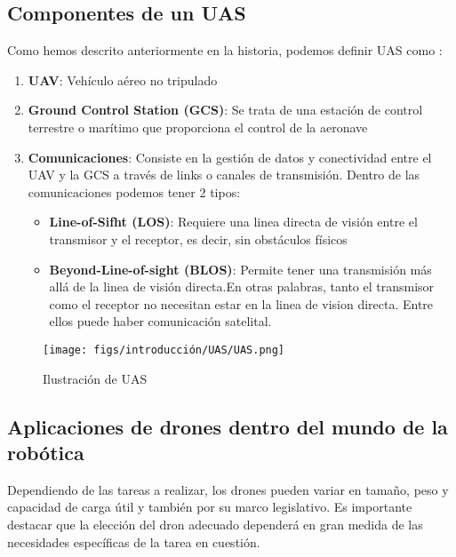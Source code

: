 \newpage
\subsection{Componentes de un UAS}
\label{sec:UAS}

Como hemos descrito anteriormente en la historia, podemos definir UAS como : 

\begin{enumerate}
  \item \textbf{UAV}: Vehículo aéreo no tripulado 
  \item \textbf{Ground Control Station (GCS)}: Se trata de una estación de control terrestre o marítimo que proporciona el control de la aeronave
  \item \textbf{Comunicaciones}: Consiste en la gestión de datos y conectividad entre el UAV y la GCS a través de links o canales de transmisión. Dentro de las comunicaciones podemos tener 2 tipos: 
  \begin{itemize}
    \item  \textbf{Line-of-Sifht (LOS)}: Requiere una linea directa de visión entre el transmisor y el receptor, es decir, sin obstáculos físicos 
    \item  \textbf{Beyond-Line-of-sight (BLOS)}: Permite tener una transmisión más allá de la linea de visión directa.En otras palabras, tanto el transmisor como el receptor no necesitan estar en la linea de vision directa. Entre ellos puede haber comunicación satelital. 

  \end{itemize}
\end{enumerate}

\begin{figure}[H]
  \begin{center}
    \texttt{[image: figs/introducción/UAS/UAS.png]}
  \end{center}
  \caption{Ilustración de UAS}
  \label{fig:uas}

  
\end{figure}

\newpage
\subsection{Aplicaciones de drones dentro del mundo de la robótica}
\label{Aplicaciones de los drones}
Dependiendo de las tareas a realizar, los drones pueden variar en tamaño, peso y capacidad de
carga útil y también por su marco legislativo. Es importante destacar que la elección del dron
adecuado dependerá en gran medida de las necesidades específicas de la tarea en cuestión. \\

